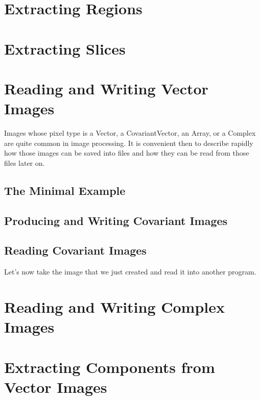 \section{Extracting Regions}
\label{sec:ImagReadRegionOfInterestWrite}


\section{Extracting Slices}
\label{sec:ImagReadExtractWrite}



\section{Reading and Writing Vector Images}
\label{sec:VectorImagReadWrite}

Images whose pixel type is a Vector, a CovariantVector, an Array, or a Complex
are quite common in image processing. It is convenient then to describe rapidly
how those images can be saved into files and how they can be read from those
files later on.

\subsection{The Minimal Example}
\label{VectorImageReadWrite}


\subsection{Producing and Writing Covariant Images}
\label{CovariantVectorImageWrite}


\subsection{Reading Covariant Images}
\label{CovariantVectorImageRead}
Let's now take the image that we just created and read it into another program.



\section{Reading and Writing Complex Images}
\label{sec:ComplexImagReadWrite}



\section{Extracting Components from Vector Images}
\label{sec:VectorImageExtractComponent}


